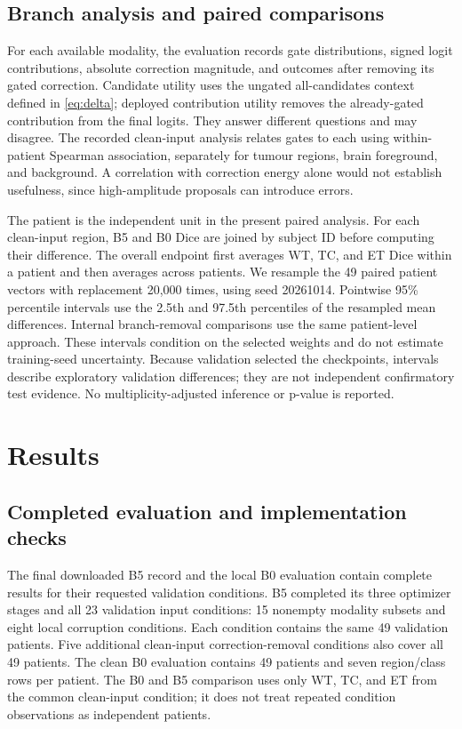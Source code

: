 \documentclass[conference]{IEEEtran}
\begin{document}
\subsection{Branch analysis and paired comparisons}
For each available modality, the evaluation records gate distributions, signed logit contributions, absolute correction magnitude, and outcomes after removing its gated correction. Candidate utility uses the ungated all-candidates context defined in \eqref{eq:delta}; deployed contribution utility removes the already-gated contribution from the final logits. They answer different questions and may disagree. The recorded clean-input analysis relates gates to each using within-patient Spearman association, separately for tumour regions, brain foreground, and background. A correlation with correction energy alone would not establish usefulness, since high-amplitude proposals can introduce errors.

The patient is the independent unit in the present paired analysis. For each clean-input region, B5 and B0 Dice are joined by subject ID before computing their difference. The overall endpoint first averages WT, TC, and ET Dice within a patient and then averages across patients. We resample the 49 paired patient vectors with replacement 20,000 times, using seed 20261014. Pointwise 95\% percentile intervals use the 2.5th and 97.5th percentiles of the resampled mean differences. Internal branch-removal comparisons use the same patient-level approach. These intervals condition on the selected weights and do not estimate training-seed uncertainty. Because validation selected the checkpoints, intervals describe exploratory validation differences; they are not independent confirmatory test evidence. No multiplicity-adjusted inference or p-value is reported.

\section{Results}
\subsection{Completed evaluation and implementation checks}
The final downloaded B5 record and the local B0 evaluation contain complete results for their requested validation conditions. B5 completed its three optimizer stages and all 23 validation input conditions: 15 nonempty modality subsets and eight local corruption conditions. Each condition contains the same 49 validation patients. Five additional clean-input correction-removal conditions also cover all 49 patients. The clean B0 evaluation contains 49 patients and seven region/class rows per patient. The B0 and B5 comparison uses only WT, TC, and ET from the common clean-input condition; it does not treat repeated condition observations as independent patients.
\end{document}
